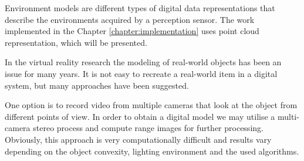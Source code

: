 \documentclass[12pt,a4paper,oneside,pdftex]{report}
\begin{document}

Environment models are different types of digital data representations that describe the environments acquired by a perception sensor. The work implemented in the Chapter \ref{chapter:implementation} uses point cloud representation, which will be presented.



In the virtual reality research the modeling of real-world objects has been an issue for many years. It is not easy to recreate a real-world item in a digital system, but many approaches have been suggested.

One option is to record video from multiple cameras that look at the object from different points of view. In order to obtain a digital model we may utilise a multi-camera stereo process and compute range images for further processing. Obviously, this approach is very computationally difficult and results vary depending on the object convexity, lighting environment and the used algorithms.  
\end{document}
